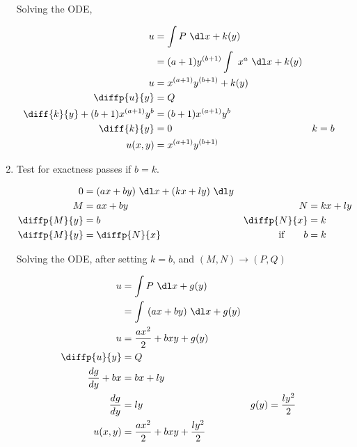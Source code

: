\begin{enumerate}
          Solving the ODE,

          \begin{align}
              u                                 & = \int P\ \dl x + k(y)                              \\
                                                & = (a+1)y^{(b+1)}\int\ x^{a}\ \dl x + k(y)           \\
              u                                 & = x^{(a+1)}y^{(b+1)} + k(y)                         \\
              \diffp{u}{y}                      & = Q                                                 \\
              \diff{k}{y} + (b+1)x^{(a+1)}y^{b} & = (b+1)x^{(a+1)}y^{b}                               \\
              \diff{k}{y}                       & = 0                                       & k & = b \\
              u(x, y)                           & = x^{(a+1)}y^{(b+1)}
          \end{align}


    \item Test for exactness passes if $ b = k $.

          \begin{align}
              0            & = (ax + by)\ \dl x + (kx + ly)\ \dl y                                 \\
              M            & = ax+by                               & N                   & = kx+ly \\
              \diffp{M}{y} & = b                                   & \diffp{N}{x}        & = k     \\
              \diffp{M}{y} & = \diffp{N}{x}                        & \text{if}\qquad   b & = k
          \end{align}

          Solving the ODE, after setting $ k = b $, and $ (M, N) \rightarrow (P, Q)$

          \begin{align}
              u                  & = \int P\ \dl x + g(y)                                                  \\
                                 & = \int\ (ax + by)\ \dl x + g(y)                                         \\
              u                  & = \frac{ax^{2}}{2} + bxy + g(y)                                         \\
              \diffp{u}{y}       & = Q                                                                     \\
              \frac{dg}{dy} + bx & = bx + ly                                                               \\
              \frac{dg}{dy}      & = ly                                        & g(y) & = \frac{ly^{2}}{2} \\
              u(x, y)            & = \frac{ax^{2}}{2} + bxy + \frac{ly^{2}}{2}
          \end{align}


\end{enumerate}
